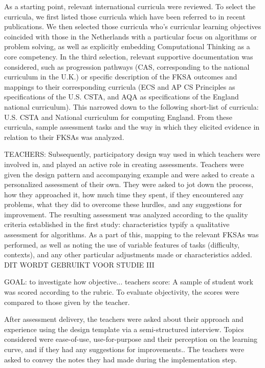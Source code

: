 As a starting point, relevant international curricula were reviewed. To select the curricula, we first listed those curricula which have been referred to in recent publications. We then selected those curricula who’s curricular learning objectives coincided with those in the Netherlands with a particular focus on algorithms or problem solving, as well as explicitly embedding Computational Thinking as a core competency. In the third selection, relevant supportive documentation was considered, such as progression pathways (CAS, corresponding to the national curriculum in the U.K.) or specific description of the FKSA outcomes and mappings to their corresponding curricula (ECS and AP CS Principles as specifications of the U.S. CSTA, and AQA as specifications of the England national curriculum). This narrowed down to the following short-list of curricula: U.S. CSTA and National curriculum for computing England. From these curricula, sample assessment tasks and the way in which they elicited evidence in relation to their FKSAs was analyzed.


TEACHERS:
Subsequently, participatory design way used in which teachers were involved in, and played an active role in creating assessments. Teachers were given the design pattern and accompanying example and were asked to create a personalized assessment of their own. They were asked to jot down the process, how they approached it, how much time they spent, if they encountered any problems, what they did to overcome these hurdles, and any suggestions for improvement. The resulting assessment was analyzed according to the quality criteria established in the first study: characteristics typify a qualitative assessment for algorithms. As a part of this, mapping to the relevant FKSAs was performed, as well as noting the use of variable features of tasks (difficulty, contexts), and any other particular adjustments made or characteristics added. DIT WORDT GEBRUIKT VOOR STUDIE III


GOAL: to investigate how objective... teachers score: A sample of student work was scored according to the rubric. To evaluate objectivity, the scores were compared to those given by the teacher.

After assessment delivery, the teachers were asked about their approach and experience using the design template via a semi-structured interview. Topics considered were ease-of-use, use-for-purpose and their perception on the learning curve, and if they had any suggestions for improvements.. The teachers were asked to convey the notes they had made during the implementation step.


